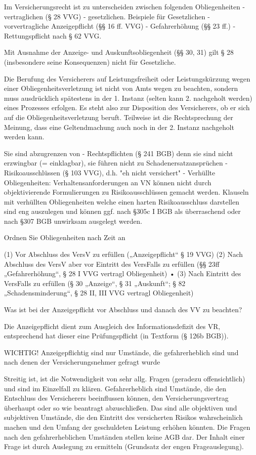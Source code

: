 Im Versicherungsrecht ist zu unterscheiden zwischen folgenden Obliegenheiten 
- vertraglichen (§ 28 VVG)
- gesetzlichen. 
Beispiele für Gesetzlichen
- vorvertragliche Anzeigepflicht (§§ 16 ff. VVG)
- Gefahrerhöhung (§§ 23 ff.)
- Rettungspflicht nach § 62 VVG.

Mit Ausnahme der Anzeige- und Auskunftsobliegenheit (§§ 30, 31) gilt § 28 (insbesondere seine Konsequenzen) nicht für Gesetzliche.

Die Berufung des Versicherers auf Leistungsfreiheit oder Leistungskürzung wegen einer Obliegenheitsverletzung 
ist nicht von Amts wegen zu beachten, sondern muss ausdrücklich spätestens in der 1. Instanz (selten kann 2. nachgeholt werden) 
eines Prozesses erfolgen. 
Es steht also zur Disposition des Versicherers, ob er sich auf die Obliegenheitsverletzung beruft. 
Teilweise ist die Rechtsprechung der Meinung, dass eine Geltendmachung auch noch in der 2. Instanz nachgeholt werden kann.

Sie sind abzugrenzen von
- Rechtspflichten (§ 241 BGB) denn sie sind nicht erzwingbar (= einklagbar), sie führen nicht zu Schadenersatzansprüchen
- Risikoausschlüssen (§ 103 VVG), d.h. "eh nicht versichert"
- Verhüllte Obliegenheiten: Verhaltensanforderungen an VN können nicht durch objektivierende Formulierungen zu Risikoausschlüssen gemacht werden.
Klauseln mit verhüllten Obliegenheiten welche einen harten Risikoausschluss darstellen sind eng auszulegen und können ggf.
nach §305c I BGB als überraschend oder nach §307 BGB unwirksam ausgelegt werden.


Ordnen Sie Obliegenheiten nach Zeit an

(1) Vor Abschluss des VersV zu erfüllen („Anzeigepflicht“ § 19 VVG)
(2) Nach Abschluss des VersV aber vor Eintritt des VersFalls zu
erfüllen (§§ 23ff „Gefahrerhöhung“, § 28 I VVG vertragl Obliegenheit)
• (3) Nach Eintritt des VersFalls zu erfüllen (§ 30 „Anzeige“, § 31
„Auskunft“; § 82 „Schadensminderung“, § 28 II, III VVG vertragl
Obliegenheit)


Was ist bei der Anzeigepflicht vor Abschluss und danach des VV zu beachten?

Die Anzeigepflicht dient zum Ausgleich des Informationsdefizit des VR, entsprechend hat dieser eine Prüfungspflicht
(in Textform (§ 126b BGB)).

WICHTIG!
Anzeigepflichtig sind nur Umstände, die gefahrerheblich sind und nach denen der Versicherungsnehmer gefragt wurde

Streitig ist, ist die Notwendigkeit von sehr allg. Fragen (geradezu offensichtlich) und sind im Einzelfall zu klären.
Gefahrerheblich sind Umstände, die den Entschluss des Versicherers beeinflussen können, 
den Versicherungsvertrag überhaupt oder so wie beantragt abzuschließen. 
Das sind alle objektiven und subjektiven Umstände, die den Eintritt des versicherten Risikos wahrscheinlich machen 
und den Umfang der geschuldeten Leistung erhöhen könnten. 
Die Fragen nach den gefahrerheblichen Umständen stellen keine AGB dar. 
Der Inhalt einer Frage ist durch Auslegung zu ermitteln (Grundsatz der engen Frageauslegung).

